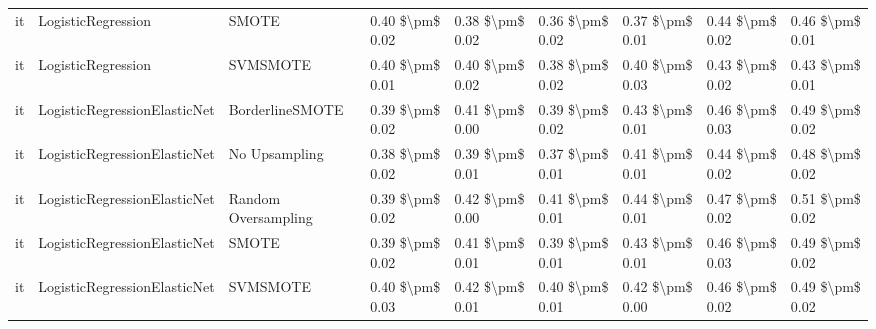\begin{tabular}{lllllllll}
      it &              LogisticRegression &                         SMOTE & 0.40 \$\textbackslash pm\$ 0.02 &           0.38 \$\textbackslash pm\$ 0.02 &       0.36 \$\textbackslash pm\$ 0.02 &        0.37 \$\textbackslash pm\$ 0.01 &                         0.44 \$\textbackslash pm\$ 0.02 &     0.46 \$\textbackslash pm\$ 0.01 \\
      it &              LogisticRegression &                      SVMSMOTE & 0.40 \$\textbackslash pm\$ 0.01 &           0.40 \$\textbackslash pm\$ 0.02 &       0.38 \$\textbackslash pm\$ 0.02 &        0.40 \$\textbackslash pm\$ 0.03 &                         0.43 \$\textbackslash pm\$ 0.02 &     0.43 \$\textbackslash pm\$ 0.01 \\
      it &    LogisticRegressionElasticNet &               BorderlineSMOTE & 0.39 \$\textbackslash pm\$ 0.02 &           0.41 \$\textbackslash pm\$ 0.00 &       0.39 \$\textbackslash pm\$ 0.02 &        0.43 \$\textbackslash pm\$ 0.01 &                         0.46 \$\textbackslash pm\$ 0.03 &     0.49 \$\textbackslash pm\$ 0.02 \\
      it &    LogisticRegressionElasticNet &                 No Upsampling & 0.38 \$\textbackslash pm\$ 0.02 &           0.39 \$\textbackslash pm\$ 0.01 &       0.37 \$\textbackslash pm\$ 0.01 &        0.41 \$\textbackslash pm\$ 0.01 &                         0.44 \$\textbackslash pm\$ 0.02 &     0.48 \$\textbackslash pm\$ 0.02 \\
      it &    LogisticRegressionElasticNet &           Random Oversampling & 0.39 \$\textbackslash pm\$ 0.02 &           0.42 \$\textbackslash pm\$ 0.00 &       0.41 \$\textbackslash pm\$ 0.01 &        0.44 \$\textbackslash pm\$ 0.01 &                         0.47 \$\textbackslash pm\$ 0.02 &     0.51 \$\textbackslash pm\$ 0.02 \\
      it &    LogisticRegressionElasticNet &                         SMOTE & 0.39 \$\textbackslash pm\$ 0.02 &           0.41 \$\textbackslash pm\$ 0.01 &       0.39 \$\textbackslash pm\$ 0.01 &        0.43 \$\textbackslash pm\$ 0.01 &                         0.46 \$\textbackslash pm\$ 0.03 &     0.49 \$\textbackslash pm\$ 0.02 \\
      it &    LogisticRegressionElasticNet &                      SVMSMOTE & 0.40 \$\textbackslash pm\$ 0.03 &           0.42 \$\textbackslash pm\$ 0.01 &       0.40 \$\textbackslash pm\$ 0.01 &        0.42 \$\textbackslash pm\$ 0.00 &                         0.46 \$\textbackslash pm\$ 0.02 &     0.49 \$\textbackslash pm\$ 0.02 \\

\end{tabular}
